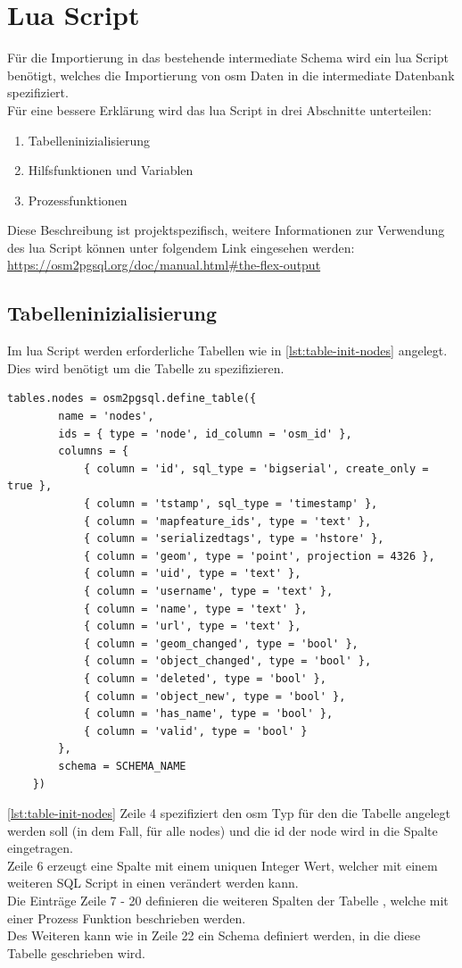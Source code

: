 \section{Lua Script}
Für die Importierung in das bestehende intermediate Schema wird ein lua Script benötigt, welches die Importierung von osm Daten in die intermediate Datenbank spezifiziert.\\
Für eine bessere Erklärung wird das lua Script in drei Abschnitte unterteilen:
\begin{enumerate}
	\item Tabelleninizialisierung
	\item Hilfsfunktionen und Variablen
	\item Prozessfunktionen
\end{enumerate}
Diese Beschreibung ist projektspezifisch, weitere Informationen zur Verwendung des lua Script können unter folgendem Link eingesehen werden: \\
\url{https://osm2pgsql.org/doc/manual.html#the-flex-output}
\subsection{Tabelleninizialisierung}\label{subsec:table-init}
Im lua Script werden erforderliche Tabellen wie in \autoref{lst:table-init-nodes} angelegt. Dies wird benötigt um die Tabelle zu spezifizieren.
\begin{lstlisting}[language={[5.0]Lua}, caption={Initialisierung eine Tabelle für alle nodes},label={lst:table-init-nodes}]
	tables.nodes = osm2pgsql.define_table({
		name = 'nodes',						
		ids = { type = 'node', id_column = 'osm_id' },
		columns = {
			{ column = 'id', sql_type = 'bigserial', create_only = true },
			{ column = 'tstamp', sql_type = 'timestamp' },
			{ column = 'mapfeature_ids', type = 'text' },
			{ column = 'serializedtags', type = 'hstore' },
			{ column = 'geom', type = 'point', projection = 4326 },
			{ column = 'uid', type = 'text' },
			{ column = 'username', type = 'text' },
			{ column = 'name', type = 'text' },
			{ column = 'url', type = 'text' },
			{ column = 'geom_changed', type = 'bool' },
			{ column = 'object_changed', type = 'bool' },
			{ column = 'deleted', type = 'bool' },
			{ column = 'object_new', type = 'bool' },
			{ column = 'has_name', type = 'bool' },
			{ column = 'valid', type = 'bool' }
		},
		schema = SCHEMA_NAME
	})
\end{lstlisting}
\autoref{lst:table-init-nodes} Zeile 4 spezifiziert den osm Typ für den die Tabelle angelegt werden soll (in dem Fall, für alle nodes) und die id der node wird in die Spalte  eingetragen.\\
Zeile 6 erzeugt eine Spalte mit einem uniquen Integer Wert, welcher mit einem weiteren SQL Script in einen  verändert werden kann.\\
Die Einträge Zeile 7 - 20 definieren die weiteren Spalten der Tabelle , welche mit einer Prozess Funktion beschrieben werden.\\
Des Weiteren kann wie in Zeile 22 ein Schema definiert werden, in die diese Tabelle geschrieben wird.

